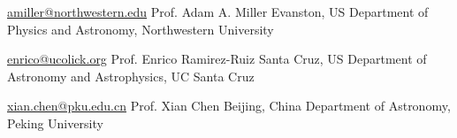 


\begin{cvreferences}
	
\cvreference
	{\href{mailto:amiller@northwestern.edu}{\faEnvelope\acvHeaderIconSep amiller@northwestern.edu}} %
	{Prof. Adam A. Miller} %
	{Evanston, US} %
	{Department of Physics and Astronomy, Northwestern University} %


	
\cvreference
	{\href{mailto:enrico@ucolick.org}{\faEnvelope\acvHeaderIconSep enrico@ucolick.org}} %
	{Prof. Enrico Ramirez-Ruiz} %
	{Santa Cruz, US} %
	{Department of Astronomy and Astrophysics, UC Santa Cruz} %


	

	

\cvreference
	{\href{mailto:xian.chen@pku.edu.cn}{\faEnvelope\acvHeaderIconSep xian.chen@pku.edu.cn}} %
	{Prof. Xian Chen} %
	{Beijing, China} %
	{Department of Astronomy, Peking University} %
	
	
	




\end{cvreferences}